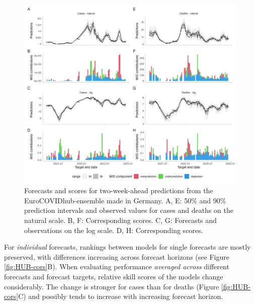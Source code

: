 \documentclass{article}
\begin{document}
\begin{figure}[h!]
    \centering
    \includegraphics[width=0.99\textwidth]{output/figures/HUB-model-comparison-ensemble.png}
    \caption{
    Forecasts and scores for two-week-ahead predictions from the EuroCOVIDhub-ensemble made in Germany. A, E: 50\% and 90\% prediction intervals and observed values for cases and deaths on the natural scale. B, F: Corresponding scores. C, G: Forecasts and observations on the log scale. D, H: Corresponding scores. 
    }
    \label{fig:HUB-model-comparison-ensemble}
\end{figure}


For \textit{individual} forecasts, rankings between models for single forecasts are mostly preserved, with differences increasing across forecast horizons (see Figure \ref{fig:HUB-cors}B). When evaluating performance \textit{averaged across} different forecasts and forecast targets, relative skill scores of the models change considerably. The change is stronger for cases than for deaths (Figure \ref{fig:HUB-cors}C) and possibly tends to increase with increasing forecast horizon. 
\end{document}
